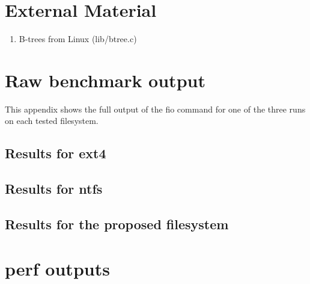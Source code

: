 \begin{appendices}
%
%
\chapter{External Material}


    \begin{enumerate}
        \item B-trees from Linux (lib/btree.c)
    \end{enumerate}

\chapter{Raw benchmark output}
    \label{app:benchmark}

    This appendix shows the full output of the fio command for one of the three
    runs on each tested filesystem.

    \section{Results for ext4}
        
    \section{Results for ntfs}
        
    \section{Results for the proposed filesystem}
        

\chapter{perf outputs}
    \label{app:perf}


\end{appendices}
